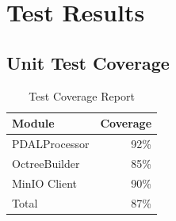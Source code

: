 \documentclass[12pt,a4paper,onecolumn,oneside]{report}
\begin{document}
\chapter{Test Results}
\label{app:tests}

\section{Unit Test Coverage}

\begin{table}[h]
    \centering
    \caption{Test Coverage Report}
    \label{tab:testcoverage}
    \begin{tabular}{|l|r|}
        \hline
        \textbf{Module} & \textbf{Coverage} \\
        \hline
        PDALProcessor & 92\% \\
        \hline
        OctreeBuilder & 85\% \\
        \hline
        MinIO Client & 90\% \\
        \hline
        Total & 87\% \\
        \hline
    \end{tabular}
\end{table}

\end{document}
